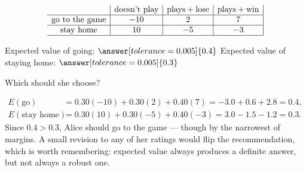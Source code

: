 \documentclass[12pt]{ximera}
\begin{document}
\begin{problem}
\begin{prompt}
\[
\begin{array}{c|c|c|c|}
\phantom{|} & \text{doesn't play} & \text{plays}+\text{lose} & \text{plays}+\text{win} \\\hline
\text{go to the game} & -10 & 2 & 7 \\\hline
\text{stay home} & 10 & -5 & -3 \\\hline
\end{array}
\]

Expected value of going: $\answer[tolerance=0.005]{0.4}$ \qquad
Expected value of staying home: $\answer[tolerance=0.005]{0.3}$

\smallskip
Which should she choose?
\begin{multipleChoice}
\end{multipleChoice}

\begin{feedback}
\begin{align*}
E(\text{go}) &= 0.30(-10) + 0.30(2) + 0.40(7) = -3.0 + 0.6 + 2.8 = 0.4,\\
E(\text{stay home}) &= 0.30(10) + 0.30(-5) + 0.40(-3) = 3.0 - 1.5 - 1.2 = 0.3.
\end{align*}
Since $0.4 > 0.3$, Alice should go to the game --- though by the narrowest of margins.
A small revision to any of her ratings would flip the recommendation, which is worth
remembering: expected value always produces a definite answer, but not always a robust
one.
\end{feedback}
\end{prompt}
\end{problem}
\end{document}
